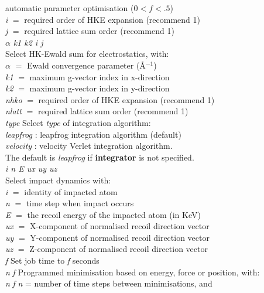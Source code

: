 \begin{tabbing}
\> \>automatic parameter optimisation ($0<f<.5$) \\
\> \> {\em i} $=$ required order of HKE expansion (recommend 1)\\
\> \> {\em j} $=$ required lattice sum order (recommend 1)\\
  $\alpha$ {\em k1 k2 i j} \\
\> \> Select HK-Ewald sum for electrostatics, with:\\
\> \> $\alpha$ $=$ Ewald convergence parameter (\AA$^{-1}$)\\
\> \> {\em k1} $=$ maximum g-vector index in x-direction\\
\> \> {\em k2} $=$ maximum g-vector index in y-direction\\
\> \> {\em nhko} $=$ required order of HKE expansion (recommend 1)\\
\> \> {\em nlatt} $=$ required lattice sum order (recommend 1)\\
 {\em type}\> Select {\em type} of integration algorithm:\\
\> \> {\em leapfrog} : leapfrog integration algorithm (default)\\
\> \> {\em velocity} : velocity Verlet integration algorithm. \\
\> \> The default is {\em leapfrog} if {\bf integrator} is not specified.\\
 {\em i n E ux uy uz}\> \\
\> \> Select impact dynamics with: \\
\> \> {\em i} $=$ identity of impacted atom \\
\> \> {\em n} $=$ time step when impact occurs \\
\> \> {\em E} $=$ the recoil energy of the impacted atom (in KeV)\\
\> \> {\em ux} $=$ X-component of normalised recoil direction vector \\
\> \> {\em uy} $=$ Y-component of normalised recoil direction vector \\
\> \> {\em uz} $=$ Z-component of normalised recoil direction vector \\
 {\em f}\> Set job time to {\em f} seconds \\
 {\em n} {\em f} \> Programmed minimisation based on
energy, force or position, with: \\
 {\em n} {\em f} \> {\em n} = number of time steps between minimisations, and\\

\end{tabbing}
